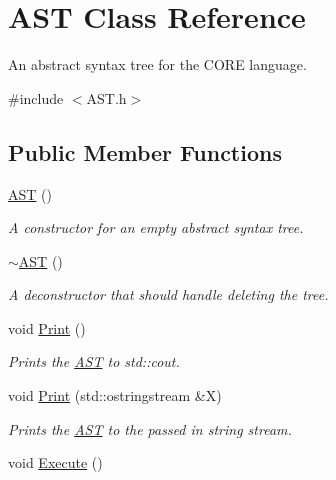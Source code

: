 \hypertarget{class_a_s_t}{}\section{A\+ST Class Reference}
\label{class_a_s_t}


An abstract syntax tree for the C\+O\+RE language.  




{\ttfamily \#include $<$A\+S\+T.\+h$>$}

\subsection*{Public Member Functions}
\begin{DoxyCompactItemize}
\item 
\mbox{\label{class_a_s_t_afd378ca7cb3049d6293e8597d31d758d}} 
\mbox{\hyperlink{class_a_s_t_afd378ca7cb3049d6293e8597d31d758d}{A\+ST}} ()
\begin{DoxyCompactList}\small\item\em A constructor for an empty abstract syntax tree. \end{DoxyCompactList}\item 
\mbox{\label{class_a_s_t_ad332977af5d4ea0ec793c4843544b6e2}} 
\mbox{\hyperlink{class_a_s_t_ad332977af5d4ea0ec793c4843544b6e2}{$\sim$\+A\+ST}} ()
\begin{DoxyCompactList}\small\item\em A deconstructor that should handle deleting the tree. \end{DoxyCompactList}\item 
\mbox{\label{class_a_s_t_af22650d6f184012dd1bdf526e3322ca6}} 
void \mbox{\hyperlink{class_a_s_t_af22650d6f184012dd1bdf526e3322ca6}{Print}} ()
\begin{DoxyCompactList}\small\item\em Prints the \mbox{\hyperlink{class_a_s_t}{A\+ST}} to std\+::cout. \end{DoxyCompactList}\item 
\mbox{\label{class_a_s_t_aa9fc06bb6400bee9f91a2f02c367ba88}} 
void \mbox{\hyperlink{class_a_s_t_aa9fc06bb6400bee9f91a2f02c367ba88}{Print}} (std\+::ostringstream \&X)
\begin{DoxyCompactList}\small\item\em Prints the \mbox{\hyperlink{class_a_s_t}{A\+ST}} to the passed in string stream. \end{DoxyCompactList}\item 
void \mbox{\hyperlink{class_a_s_t_add81dbf0bbcd986b5fef53f641865462}{Execute}} ()
\end{DoxyCompactItemize}

